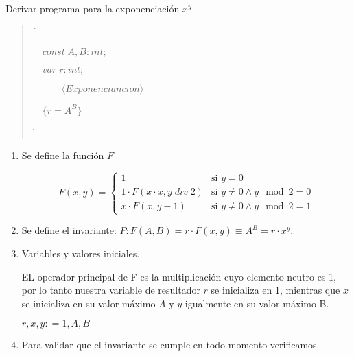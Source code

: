 \documentclass[hidelinks]{article}
\newenvironment{absolutelynopagebreak}
{\Needspace{10\baselineskip}\begin{quote}}
		{\end{quote}}
\begin{document}
Derivar programa para la exponenciación $x^y$.\par

\begin{absolutelynopagebreak}
	[\par
		$\quad const \; A, B: int;$\par
		$\quad var \; r : int;$\par
		$\qquad \quad \langle Exponenciancion \rangle$ \par
		$\quad \{r =A^B\}$ \par
	]\par
\end{absolutelynopagebreak}\par

\begin{enumerate}
	\item Se define la función $F$\par

	      \begin{equation}
		      F(x,y) =
		      \begin{cases}
			      1                                   & \text{si } y = 0                       \\
			      1 \cdot F(x \cdot x, y \; div \; 2) & \text{si } y \neq 0 \land y \mod 2 = 0 \\
			      x \cdot F(x, y - 1)                 & \text{si } y \neq 0 \land y \mod 2 = 1
		      \end{cases}
	      \end{equation} \par

	\item Se define el invariante: $P: F(A,B) = r \cdot F(x,y) \equiv A^B = r \cdot x^y$.\par
	\item Variables y valores iniciales.\par

	      EL operador principal de F es la multiplicación cuyo elemento neutro es 1, por
	      lo tanto nuestra variable de resultador $r$ se inicializa en 1, mientras que
	      $x$ se inicializa en su valor máximo $A$ y $y$ igualmente en su valor máximo B.\par

	      \begin{center}
		      $r,x,y : = 1, A, B$
	      \end{center}

	\item Para validar que el invariante se cumple en todo momento verificamos.


\end{enumerate}
\end{document}

